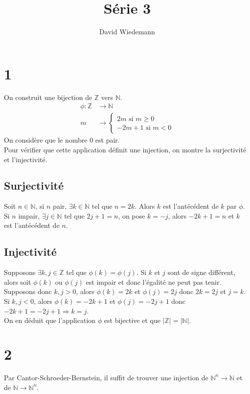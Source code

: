 \documentclass[11pt, a4paper, twoside]{article}
\begin{document}
\title{Série 3}
\author{David Wiedemann}
\maketitle
\section*{1}
On construit une bijection de $\mathbb{Z}$ vers $\mathbb{N}$.\\
\begin{align*}
	\phi \colon \mathbb{Z} &\to \mathbb{N}\\
	m & \to 
	\begin{cases}
	2m \text{ si } m \geq 0\\
	-2m +1 \text{ si } m < 0
	\end{cases}
\end{align*}
On considère que le nombre 0 est pair.\\
Pour vérifier que cette application définit une injection, on montre la surjectivité et l'injectivité.\\
\subsection*{Surjectivité}
Soit $n \in \mathbb{N}$, si $n$ pair, $\exists k \in \mathbb{N} \text{ tel que } n = 2k$. Alors $k$ est l'antécédent de $k$ par $\phi$.\\
Si $n$ impair, $\exists j \in \mathbb{N}$ tel que $2j+1=n$, on pose $k=-j$, alors $-2k+1 =n$ et $k$ est l'antécédent de $n$.
\subsection*{Injectivité}
Supposons $\exists k,j \in \mathbb{Z}$ tel que $\phi(k)=\phi(j)$. Si $k$ et $j$ sont de signe différent, alors soit $\phi(k)$ ou $\phi(j)$ est impair et donc l'égalité ne peut pas tenir.\\
Supposons donc $k, j  > 0$, alors $\phi(k) = 2k $ et $\phi(j) = 2j$ donc $2k=2j$ et $j=k$.\\
Si $k, j <0 $, alors $\phi(k) = -2k + 1$ et $\phi(j) = -2j +1$ donc $-2k+1 = -2j + 1 \Rightarrow k =j$.	\\

On en déduit que l'application $\phi$ est bijective et que $|\mathbb{Z}| = |\mathbb{N}|$.
\section*{2}
Par Cantor-Schroeder-Bernstein, il suffit de trouver une injection de $ \mathbb{N}^{n} \to \mathbb{N}$
et de $\mathbb{N} \to \mathbb{N}^{n}$.\\
\end{document}
